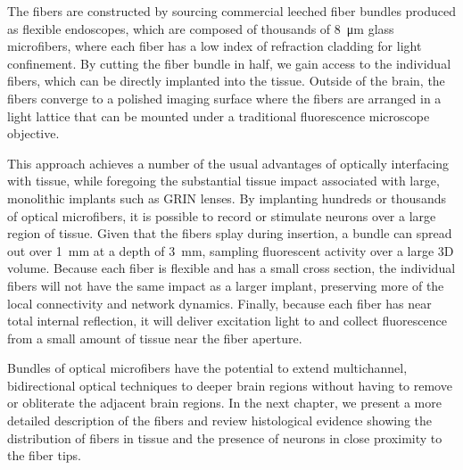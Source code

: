 The fibers are constructed by sourcing commercial leeched 
fiber bundles produced as flexible endoscopes, which are 
composed of thousands of 8~\si{\micro\meter} glass microfibers, 
where each fiber has a low index of refraction cladding for 
light confinement. By cutting the fiber bundle in half, we 
gain access to the individual fibers, which can be directly 
implanted into the tissue. Outside of the brain, the fibers 
converge to a polished imaging surface where the fibers are 
arranged in a light lattice that can be mounted under a 
traditional fluorescence microscope objective.

This approach achieves a number of the usual advantages 
of optically interfacing with tissue, while foregoing the 
substantial tissue impact associated with large, monolithic 
implants such as GRIN lenses. By implanting hundreds or 
thousands of optical microfibers, it is possible to record 
or stimulate neurons over a large region of tissue. Given 
that the fibers splay during insertion, a bundle can spread 
out over 1~mm at a depth of 3~mm, sampling fluorescent 
activity over a large 3D volume. Because 
each fiber is flexible and has a small cross section, the 
individual fibers will not have the same impact as a 
larger implant, preserving more of the local connectivity 
and network dynamics. Finally, because each fiber has 
near total internal reflection, it will deliver excitation 
light to and collect fluorescence from a small amount of 
tissue near the fiber aperture.

Bundles of optical microfibers have the potential to 
extend multichannel, bidirectional optical techniques to 
deeper brain regions without having to remove or obliterate 
the adjacent brain regions. In the next chapter, we 
present a more detailed description of the fibers and 
review histological evidence showing the distribution 
of fibers in tissue and the presence of neurons in close 
proximity to the fiber tips.
